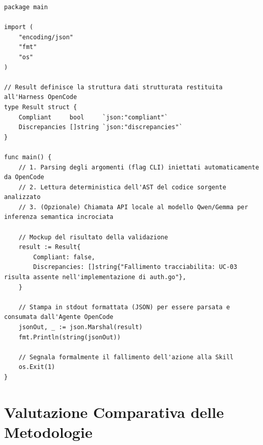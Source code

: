 \documentclass[a4paper, 11pt]{article}
\begin{document}
\begin{lstlisting}[style=gostyle, caption={Struttura base del Sidecar Executable (CLI) scritto in Go e invocato dalla Skill OpenCode.}]
package main

import (
	"encoding/json"
	"fmt"
	"os"
)

// Result definisce la struttura dati strutturata restituita all'Harness OpenCode
type Result struct {
	Compliant     bool     `json:"compliant"`
	Discrepancies []string `json:"discrepancies"`
}

func main() {
	// 1. Parsing degli argomenti (flag CLI) iniettati automaticamente da OpenCode
	// 2. Lettura deterministica dell'AST del codice sorgente analizzato
	// 3. (Opzionale) Chiamata API locale al modello Qwen/Gemma per inferenza semantica incrociata
	
	// Mockup del risultato della validazione
	result := Result{
		Compliant: false,
		Discrepancies: []string{"Fallimento tracciabilita: UC-03 risulta assente nell'implementazione di auth.go"},
	}
	
	// Stampa in stdout formattata (JSON) per essere parsata e consumata dall'Agente OpenCode
	jsonOut, _ := json.Marshal(result)
	fmt.Println(string(jsonOut))
	
	// Segnala formalmente il fallimento dell'azione alla Skill
	os.Exit(1) 
}
\end{lstlisting}

\section{Valutazione Comparativa delle Metodologie}
\end{document}
